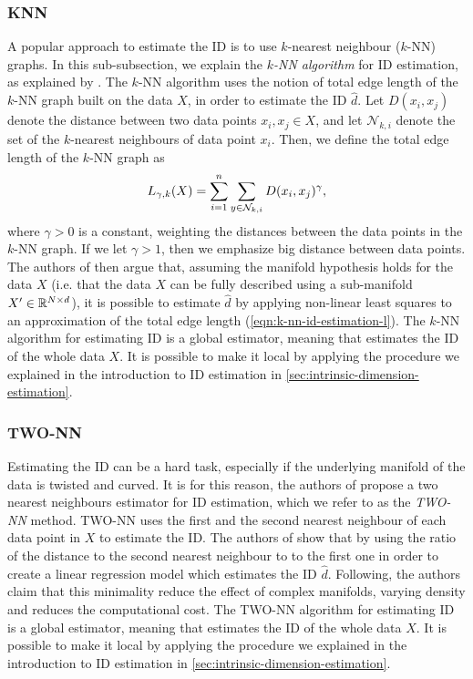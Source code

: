 \subsubsection{KNN}
\label{sec:id-estimation-knn}
A popular approach to estimate the ID is to use $k$-nearest neighbour ($k$-NN) graphs. In this sub-subsection, we explain the \textit{$k$-NN algorithm} for ID estimation, as explained by \cite[p. 651]{Carter2010}. The $k$-NN algorithm uses the notion of total edge length of the $k$-NN graph built on the data $X$, in order to estimate the ID $\hat{d}$. Let $D(x_i, x_j)$ denote the distance between two data points $x_i, x_j \in X$, and let $\mathcal{N}_{k, i}$ denote the set of the $k$-nearest neighbours of data point $x_i$. Then, we define the total edge length of the $k$-NN graph as
\begin{align}
    L_{\gamma, k}(X) = \sum\limits_{i=1}^{n} \sum\limits_{y \in \mathcal{N}_{k, i}}^{} D(x_i, x_j)^\gamma,
    \label{eqn:k-nn-id-estimation-l}
\end{align}
where $\gamma>0$ is a constant, weighting the distances between the data points in the $k$-NN graph. If we let $\gamma>1$, then we emphasize big distance between data points. The authors of \cite[p. 651]{Carter2010} then argue that, assuming the manifold hypothesis holds for the data $X$ (i.e. that the data $X$ can be fully described using a sub-manifold $X' \in \mathbb{R}^{N \times d}$), it is possible to estimate $\hat{d}$ by applying non-linear least squares to an approximation of the total edge length (\cref{eqn:k-nn-id-estimation-l}). The $k$-NN algorithm for estimating ID is a global estimator, meaning that estimates the ID of the whole data $X$. It is possible to make it local by applying the procedure we explained in the introduction to ID estimation in \cref{sec:intrinsic-dimension-estimation}. 

\subsubsection{TWO-NN}
\label{sec:id-estimation-twonn}
Estimating the ID can be a hard task, especially if the underlying manifold of the data is twisted and curved. It is for this reason, the authors of \cite{Facco2017twonn} propose a two nearest neighbours estimator for ID estimation, which we refer to as the \textit{TWO-NN} method. TWO-NN uses the first and the second nearest neighbour of each data point in $X$ to estimate the ID. The authors of \cite{Facco2017twonn} show that by using the ratio of the distance to the second nearest neighbour to to the first one in order to create a linear regression model which estimates the ID $\hat{d}$. Following, the authors claim that this minimality reduce the effect of complex manifolds, varying density and reduces the computational cost. The TWO-NN algorithm for estimating ID is a global estimator, meaning that estimates the ID of the whole data $X$. It is possible to make it local by applying the procedure we explained in the introduction to ID estimation in \cref{sec:intrinsic-dimension-estimation}.

